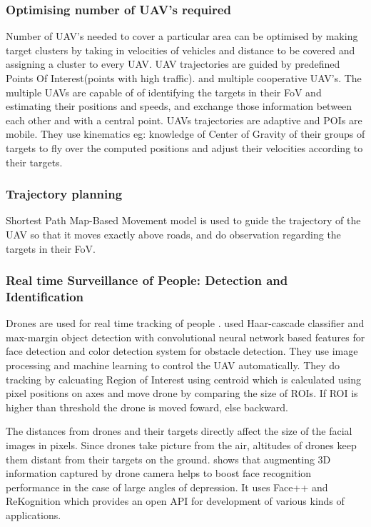 \documentclass[10pt,twocolumn,letterpaper]{article}
\begin{document}
 \subsubsection{Optimising number of UAV's required} 
 Number of UAV's needed to cover a particular area can be optimised by making target clusters by taking in velocities of vehicles and distance to be covered and assigning a cluster to every UAV. UAV trajectories are guided by predefined Points Of Interest(points with high traffic). \cite{1618950} and multiple cooperative UAV's. The multiple UAVs are capable of of identifying the targets in their FoV and estimating their positions and speeds, and exchange those information between each other and with a central point. UAVs trajectories are adaptive and POIs are mobile. They use kinematics eg: knowledge of Center of Gravity of their groups of targets to fly over the computed positions and adjust their velocities according to their targets. \\
 
 \subsubsection{Trajectory planning}
  Shortest Path Map-Based Movement model is used to guide the trajectory of the UAV so that it moves exactly above roads, and do observation regarding the targets in their FoV. \\
\subsubsection{Real time Surveillance of People: Detection and Identification}  
  Drones are used for real time tracking of people \cite{8692269}. \cite{8692269} used Haar-cascade classifier and max-margin object detection with convolutional neural network based features for face detection and color detection system for
obstacle detection. They use image processing and machine learning to control the UAV automatically. They do tracking by calcuating Region of Interest using centroid which is calculated using pixel positions on axes and move drone by comparing the size of ROIs. If ROI is higher than threshold the drone is moved foward, else backward.

The distances from drones and their targets directly affect
the size of the facial images in pixels. Since drones take picture from the air, altitudes of drones keep them distant from their targets on the ground. 
shows that augmenting 3D information captured by drone camera helps to
boost face recognition performance in the case of large angles of
depression. It uses Face++ and ReKognition which provides an open API for development of various kinds of applications.
\end{document}
